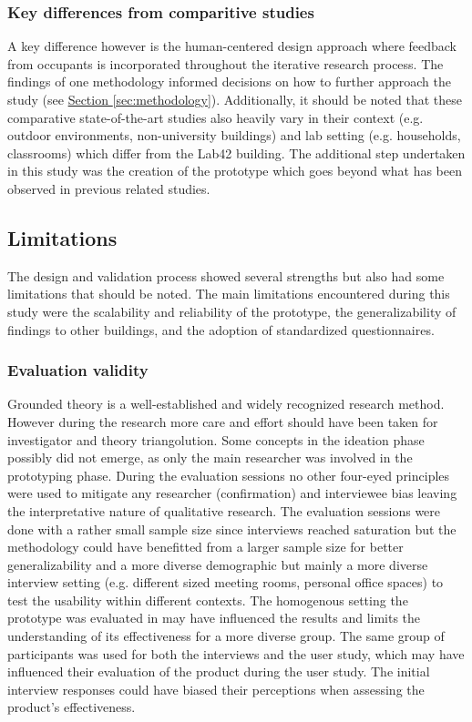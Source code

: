 \subsubsection{Key differences from comparitive studies}

A key difference however is the human-centered design approach where feedback from occupants is incorporated throughout the iterative research process. The findings of one methodology informed decisions on how to further approach the study (see \hyperref[osec:methodology]{Section \ref*{sec:methodology}}). Additionally, it should be noted that these comparative state-of-the-art studies also heavily vary in their context (e.g. outdoor environments, non-university buildings) and lab setting (e.g. households, classrooms) which differ from the Lab42 building. The additional step undertaken in this study was the creation of the prototype which goes beyond what has been observed in previous related studies.

\subsection{Limitations}

The design and validation process showed several strengths but also had some limitations that should be noted. The main limitations encountered during this study were the scalability and reliability of the prototype, the generalizability of findings to other buildings, and the adoption of standardized questionnaires.

\subsubsection{Evaluation validity}

Grounded theory is a well-established and widely recognized research method. However during the research more care and effort should have been taken for investigator and theory triangolution. Some concepts in the ideation phase possibly did not emerge, as only the main researcher was involved in the prototyping phase. During the evaluation sessions no other four-eyed principles were used to mitigate any researcher (confirmation) and interviewee bias leaving the interpretative nature of qualitative research. The evaluation sessions were done with a rather small sample size since interviews reached saturation but the methodology could have benefitted from a larger sample size for better generalizability and a more diverse demographic but mainly a more diverse interview setting (e.g. different sized meeting rooms, personal office spaces) to test the usability within different contexts. The homogenous setting the prototype was evaluated in may have influenced the results and limits the understanding of its effectiveness for a more diverse group. The same group of participants was used for both the interviews and the user study, which may have influenced their evaluation of the product during the user study. The initial interview responses could have biased their perceptions when assessing the product’s effectiveness.

